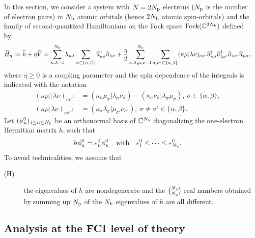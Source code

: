 \documentclass[11pt]{article}
\def\C{{\mathbb C}}
\begin{document}
In this section, we consider a system with $N=2 N_{\rm p}$ electrons ($N_{\rm p}$ is the number of electron pairs) in $N_{\rm b}$ atomic orbitals (hence $2N_{\rm b}$ atomic spin-orbitals) and the family of second-quantized Hamiltonians on the Fock space ${\rm Fock}(\C^{2N_{\rm b}})$ defined by
$$
\widehat H_\eta := \widehat h + \eta \widehat V = \sum_{\kappa,\lambda=1}^{N_{\rm b}} h_{\kappa\lambda} \sum_{\sigma \in \{\alpha,\beta\}} \widehat a_{\kappa\sigma}^\dagger \widehat a_{\lambda\sigma} + \frac{\eta}2 \sum_{\kappa,\lambda,\mu,\nu=1}^{N_{\rm b}} \sum_{\sigma,\sigma' \in \{\alpha,\beta\}} (\kappa\mu|\lambda\nu)_{\sigma\sigma'}  \widehat a_{\kappa\sigma}^\dagger \widehat a_{\lambda\sigma'}^\dagger  \widehat a_{\nu\sigma'} \widehat a_{\mu\sigma},
$$
where $\eta\ge0$ is a coupling parameter and the spin dependence of the integrals is indicated with the notation
\begin{align*}
(\kappa\mu||\lambda\nu)_{\sigma\sigma}:&=(\kappa_\sigma \mu_\sigma|\lambda_\sigma \nu_\sigma)-(\kappa_\sigma \nu_\sigma|\lambda_\sigma \mu_\sigma),~\sigma\in\{\alpha,\beta\},\\
(\kappa\mu|\lambda\nu)_{\sigma\sigma'}:&=(\kappa_\sigma \lambda_\sigma|\mu_{\sigma'} \nu_{\sigma'}),~\sigma \neq \sigma'\in\{\alpha,\beta\}.
\end{align*}
Let $(\phi_n^0)_{1\le n\le N_{\rm b}}$ be an orthonormal basis of $\C^{N_{\rm b}}$ diagonalizing the one-electron Hermitian matrix $h$, such that
$$
h\phi_n^0 =\varepsilon_n^0 \phi_n^0\quad\text{with}\quad\varepsilon_1^0\le\cdots\le\varepsilon_{N_{\rm b}}^0.
$$
To avoid technicalities, we assume that 
\begin{description}
\item[(H)] the eigenvalues of $h$ are nondegenerate and the $\binom{N_{\rm b}}{N_{\rm p}}$ real numbers obtained by summing up $N_{\rm p}$ of the $N_{\rm b}$ eigenvalues of $h$ are all different. 
\end{description}

\subsection{Analysis at the FCI level of theory}\label{subsec:theoretical comparison general framework}
\end{document}
